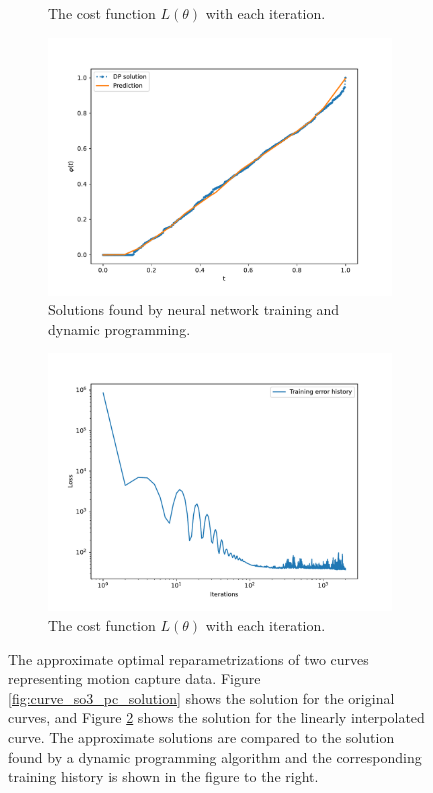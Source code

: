 \begin{figure}[t]
\begin{subfigure}[t]{0.5\textwidth}
        \caption{The cost function \(L(\theta)\) with each iteration.}\label{fig:curve_so3_pc_history}
    \end{subfigure}
    \begin{subfigure}[t]{0.5\textwidth}
        \centering
        \includegraphics[width=\linewidth]{figures/curve_so3/pl_eks_6/plot_288_0.pdf}
        \caption{Solutions found by neural network training and dynamic programming.}\label{fig:curve_so3_pl_solution}
    \end{subfigure}
    \begin{subfigure}[t]{0.5\textwidth}
        \centering
        \includegraphics[width=\linewidth]{figures/curve_so3/pl_eks_6/history_plot_288.pdf}
        \caption{The cost function \(L(\theta)\) with each iteration.}\label{fig:curve_so3_pl_history}
    \end{subfigure}
    \caption{The approximate optimal reparametrizations of two curves representing motion capture data. Figure \ref{fig:curve_so3_pc_solution} shows the solution for the original curves, and Figure \ref{fig:curve_so3_pl_solution} shows the solution for the linearly interpolated curve. The approximate solutions are compared to the solution found by a dynamic programming algorithm and the corresponding training history is shown in the figure to the right. }\label{fig:curve_1_so3_example}
\end{figure}

